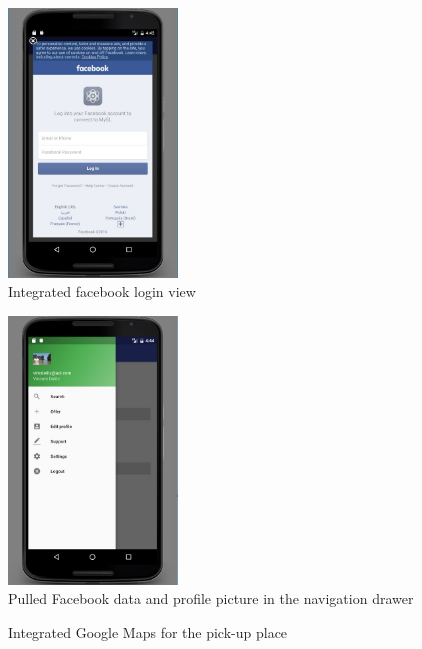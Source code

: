 \documentclass[11pt,twoside,a4paper]{report}
\begin{document}
\begin{appendices}
\begin{figure}
	\centering
	\includegraphics[width=0.4\textwidth]{jpg/facebook2.jpg}
	\caption{Integrated facebook login view}
	\label{figure:search-view}
\end{figure}

\begin{figure}
	\centering
	\includegraphics[width=0.4\textwidth]{jpg/facebook3.jpg}
	\caption{Pulled Facebook data and profile picture in the navigation drawer}
	\label{figure:specify-search-view}
\end{figure}

\begin{figure}
	\centering
	\caption{Integrated Google Maps for the pick-up place}
	\label{figure:overview}
\end{figure}


\end{appendices}
\end{document}
